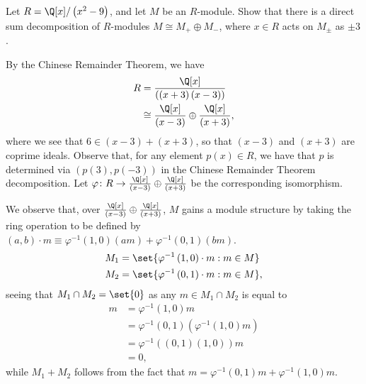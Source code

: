 \documentclass[10pt]{mypackage}
\begin{document}
\begin{problem}[Problem 8]
  Let $R = \Q[x]/\left( x^2-9 \right)$, and let $M$ be an $R$-module. Show that there is a direct sum decomposition of $R$-modules $M\cong M_{+}\oplus M_{-}$, where $x\in R$ acts on $M_{\pm}$ as $\pm 3$.
\end{problem}
\begin{solution}
  By the Chinese Remainder Theorem, we have
  \begin{align*}
    R &= \frac{\Q[x]}{\left( \left( x + 3 \right)\left( x-3 \right) \right)}\\
      &\cong \frac{\Q[x]}{\left( x-3 \right)} \oplus \frac{\Q[x]}{\left( x + 3 \right)},
  \end{align*}
  where we see that $6\in \left( x - 3 \right) + \left( x + 3 \right)$, so that $\left( x-3 \right)$ and $\left( x+3 \right)$ are coprime ideals. Observe that, for any element $p(x)\in R$, we have that $p$ is determined via $\left( p(3),p(-3) \right)$ in the Chinese Remainder Theorem decomposition. Let $\varphi\colon R\rightarrow \frac{\Q[x]}{\left( x-3 \right)}\oplus \frac{\Q[x]}{\left( x+3 \right)}$ be the corresponding isomorphism.

  We observe that, over $\frac{\Q[x]}{\left( x-3 \right)}\oplus \frac{\Q[x]}{\left( x+3 \right)}$, $M$ gains a module structure by taking the ring operation to be defined by $\left( a,b \right)\cdot m \equiv \varphi^{-1}\left( 1,0 \right)(am) + \varphi^{-1}\left( 0,1 \right)(bm)$. 
  \begin{align*}
    M_1 &= \set{\varphi^{-1}\left( 1,0 \right)\cdot m : m\in M}\\
    M_2 &= \set{\varphi^{-1}\left( 0,1 \right)\cdot m : m\in M},
  \end{align*}
  seeing that $M_1\cap M_2 = \set{0}$ as any $m\in M_1\cap M_2$ is equal to 
  \begin{align*}
    m &= \varphi^{-1}\left( 1,0 \right)m\\
      &= \varphi^{-1}\left( 0,1 \right)\left( \varphi^{-1}\left( 1,0 \right)m \right)\\
      &= \varphi^{-1}\left( \left( 0,1 \right)\left( 1,0 \right) \right)m\\
      &= 0,
  \end{align*}
  while $M_1 + M_2$ follows from the fact that $m = \varphi^{-1}\left( 0,1 \right)m + \varphi^{-1}\left( 1,0 \right)m$.


\end{solution}
\end{document}
